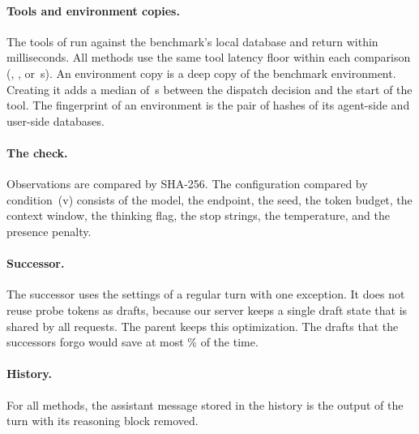 \paragraph{Tools and environment copies.}
The tools of \taubench run against the benchmark's local database and return within milliseconds.
All methods use the same tool latency floor within each comparison (\ToolLowFloor, \ToolMidFloor, or \ToolHighFloor\,s).
An environment copy is a deep copy of the benchmark environment.
Creating it adds a median of \MotCopyMedian\,s between the dispatch decision and the start of the tool.
The fingerprint of an environment is the pair of hashes of its agent-side and user-side databases.

\paragraph{The check.}
Observations are compared by SHA-256.
The configuration compared by condition~(v) consists of the model, the endpoint, the seed, the token budget, the context window, the thinking flag, the stop strings, the temperature, and the presence penalty.

\paragraph{Successor.}
The successor uses the settings of a regular turn with one exception.
It does not reuse probe tokens as drafts, because our server keeps a single draft state that is shared by all requests.
The parent keeps this optimization.
The drafts that the successors forgo would save at most \MotDraftForgonePct\% of the time.

\paragraph{History.}
For all methods, the assistant message stored in the history is the output of the turn with its reasoning block removed.
